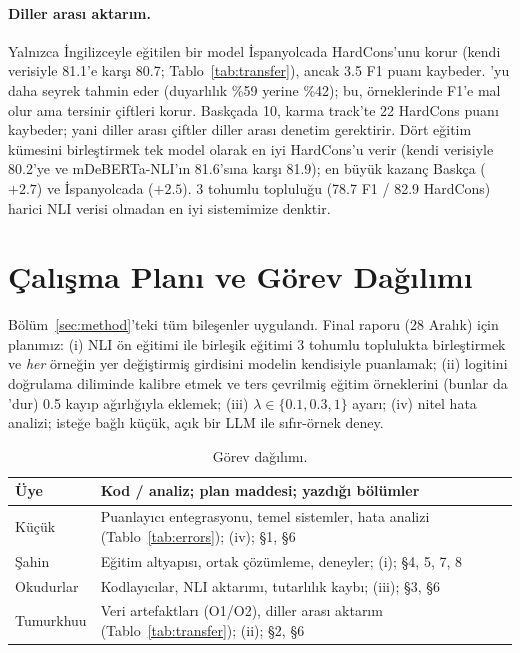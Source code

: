 

\paragraph{Diller arası aktarım.} Yalnızca İngilizceyle eğitilen bir model İspanyolcada HardCons'unu korur (kendi verisiyle 81.1'e karşı 80.7; Tablo~\ref{tab:transfer}), ancak 3.5 F1 puanı kaybeder. \NO'yu daha seyrek tahmin eder (duyarlılık \%59 yerine \%42); bu, \NO örneklerinde F1'e mal olur ama tersinir çiftleri korur. Baskçada 10, karma track'te 22 HardCons puanı kaybeder; yani diller arası çiftler diller arası denetim gerektirir. Dört eğitim kümesini birleştirmek tek model olarak en iyi HardCons'u verir (kendi verisiyle 80.2'ye ve mDeBERTa-NLI'ın 81.6'sına karşı 81.9); en büyük kazanç Baskça ($+2.7$) ve İspanyolcada ($+2.5$). 3 tohumlu topluluğu (78.7 F1 / 82.9 HardCons) harici NLI verisi olmadan en iyi sistemimize denktir.

\section{Çalışma Planı ve Görev Dağılımı}
\label{sec:plan}

Bölüm~\ref{sec:method}'teki tüm bileşenler uygulandı. Final raporu (28 Aralık) için planımız:
(i) NLI ön eğitimi ile birleşik eğitimi 3 tohumlu toplulukta birleştirmek ve \emph{her} örneğin yer değiştirmiş girdisini modelin kendisiyle puanlamak;
(ii) \NO logitini doğrulama diliminde kalibre etmek ve ters çevrilmiş \NO eğitim örneklerini (bunlar da \NO'dur) 0.5 kayıp ağırlığıyla eklemek;
(iii) $\lambda\in\{0.1, 0.3, 1\}$ ayarı;
(iv) nitel hata analizi; isteğe bağlı küçük, açık bir LLM ile sıfır-örnek deney.

\begin{table}[h]
\centering\small
\setlength{\tabcolsep}{3pt}
\begin{tabular}{@{}lp{}@{}}
\toprule
Üye & Kod / analiz; plan maddesi; yazdığı bölümler \\
\midrule
Küçük & Puanlayıcı entegrasyonu, temel sistemler, hata analizi (Tablo~\ref{tab:errors}); (iv); \S1, \S6 \\
Şahin & Eğitim altyapısı, ortak çözümleme, deneyler; (i); \S4, 5, 7, 8 \\
Okudurlar & Kodlayıcılar, NLI aktarımı, tutarlılık kaybı; (iii); \S3, \S6 \\
Tumurkhuu & Veri artefaktları (O1/O2), diller arası aktarım (Tablo~\ref{tab:transfer}); (ii); \S2, \S6 \\
\bottomrule
\end{tabular}
\caption{Görev dağılımı.}
\label{tab:plan}
\end{table}
